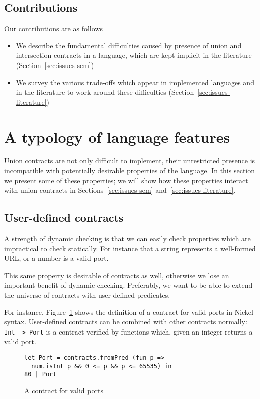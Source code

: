 \documentclass[sigplan,screen,10pt]{acmart}
\newcommand{\nickel}[1]{\lstinline[language=nickel]{#1}}
\begin{document}
\subsection{Contributions}
Our contributions are as follows
\begin{itemize}
\item We describe the fundamental difficulties caused by presence of
  union and intersection contracts in a language, which are kept
  implicit in the literature (Section~\ref{sec:issues-sem})
\item We survey the various trade-offs which appear in implemented
  languages and in the literature to work around these difficulties
  (Section~\ref{sec:issues-literature})
\end{itemize}

\section{A typology of language features}
\label{sec:feat-lang}

Union contracts are not only difficult to implement, their
unrestricted presence is incompatible with potentially desirable
properties of the language. In this section we present some of these
properties; we will show how these properties interact with union
contracts in Sections~\ref{sec:issues-sem}
and~\ref{sec:issues-literature}.

\subsection{User-defined contracts}
\label{sec:flat-contracts}

A strength of dynamic checking is that we can easily check properties which
are impractical to check statically. For instance that a string
represents a well-formed URL, or a number is a valid port.

This same property is desirable of contracts as well, otherwise we
lose an important benefit of dynamic checking. Preferably, we want to
be able to extend the universe of contracts with user-defined
predicates.

For instance, Figure~\ref{fig:port-contract} shows the definition of a
contract for valid ports in Nickel syntax.
%
User-defined contracts can be combined with other contracts normally:
\nickel{Int -> Port} is a contract verified by functions
which, given an integer returns a valid port.


\begin{figure}[h]
  \begin{center}
\begin{lstlisting}[language=nickel]
let Port = contracts.fromPred (fun p =>
  num.isInt p && 0 <= p && p <= 65535) in
80 | Port
\end{lstlisting}
\end{center}
\caption{A contract for valid ports}
\label{fig:port-contract}
\end{figure}
\end{document}
